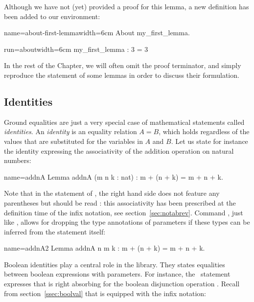Although we have not (yet) provided a proof for this lemma, a new
definition has been added to our environment:

\begin{coq}{name=about-first-lemma}{width=6cm}
About my_first_lemma.
\end{coq}
\begin{coqout}{run=about}{width=6cm}
my_first_lemma : 3 = 3
\end{coqout}


In the rest of the Chapter, we will often omit the  proof
terminator, and simply reproduce the statement of some lemmas in
order to discuss their formulation.

\subsection{Identities}\label{ssec:id}

Ground equalities are just a very special case of mathematical
statements called \emph{identities}. An \emph{identity} is an equality
relation $A = B$, which holds regardless of the values that are
substituted for the variables in $A$ and $B$.
Let us state for instance the identity expressing the associativity of
the addition operation on natural numbers:

\begin{coq}{name=addnA}{}
Lemma addnA (m n k : nat) : m + (n + k) = m + n + k.
\end{coq}

Note that in the statement of , the right hand side does not
feature any parentheses but should be read : this
associativity has been prescribed at the definition time of the infix
\C{+} notation, see section~\ref{sec:notabrev}. Command
, just like , allows for
dropping the type annotations of parameters if these types can be
inferred from the statement itself:

\begin{coq}{name=addnA2}{}
Lemma addnA n m k : m + (n + k) = m + n + k.
\end{coq}

Boolean identities play a central role in the \mcbMC{} library. They
states equalities between boolean expressions with parameters. For
instance, the~ statement expresses that  is right absorbing
for the boolean disjunction operation . Recall from
section~\ref{ssec:boolval} that  is equipped with the \C{||}
infix notation:

